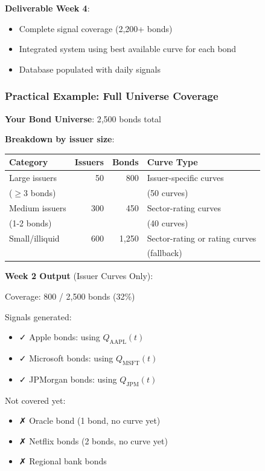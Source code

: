 \documentclass[11pt,a4paper]{article}
\begin{document}
\textbf{Deliverable Week 4}:
\begin{itemize}
    \item Complete signal coverage (2,200+ bonds)
    \item Integrated system using best available curve for each bond
    \item Database populated with daily signals
\end{itemize}

\subsubsection{Practical Example: Full Universe Coverage}

\begin{examplebox}
\textbf{Your Bond Universe}: 2,500 bonds total

\textbf{Breakdown by issuer size}:

\vspace{0.3cm}
\noindent
\begin{tabular}{lrrp{6cm}}
\toprule
\textbf{Category} & \textbf{Issuers} & \textbf{Bonds} & \textbf{Curve Type} \\
\midrule
Large issuers & 50 & 800 & Issuer-specific curves \\
($\geq 3$ bonds) & & & (50 curves) \\
\midrule
Medium issuers & 300 & 450 & Sector-rating curves \\
(1-2 bonds) & & & (40 curves) \\
\midrule
Small/illiquid & 600 & 1,250 & Sector-rating or rating curves \\
& & & (fallback) \\
\bottomrule
\end{tabular}

\vspace{0.3cm}

\textbf{Week 2 Output} (Issuer Curves Only):

Coverage: 800 / 2,500 bonds (32\%)

Signals generated:
\begin{itemize}
    \item ✓ Apple bonds: using $Q_{\text{AAPL}}(t)$
    \item ✓ Microsoft bonds: using $Q_{\text{MSFT}}(t)$
    \item ✓ JPMorgan bonds: using $Q_{\text{JPM}}(t)$
\end{itemize}

Not covered yet:
\begin{itemize}
    \item ✗ Oracle bond (1 bond, no curve yet)
    \item ✗ Netflix bonds (2 bonds, no curve yet)
    \item ✗ Regional bank bonds
\end{itemize}


\end{examplebox}
\end{document}
